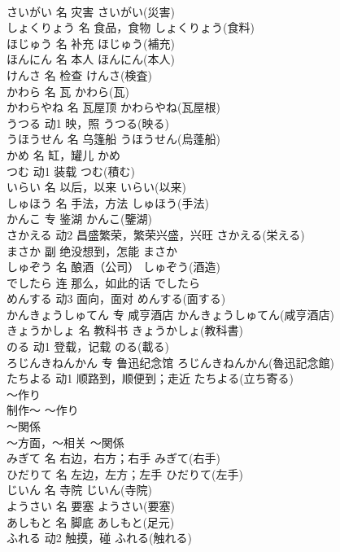 \documentclass[8pt]{extreport}
\begin{document}
\begin{CJK}{UTF8}{min}
\\	さいがい	名	灾害	さいがい(災害)	
\\	しょくりょう	名	食品，食物	しょくりょう(食料)	
\\	ほじゅう	名	补充	ほじゅう(補充)	
\\	ほんにん	名	本人	ほんにん(本人)	
\\	けんさ	名	检查	けんさ(検査)	
\\	かわら	名	瓦	かわら(瓦)	
\\	かわらやね	名	瓦屋顶	かわらやね(瓦屋根)	
\\	うつる	动1	映，照	うつる(映る)	
\\	うほうせん	名	乌篷船	うほうせん(烏蓬船)	
\\	かめ	名	缸，罐儿	かめ	
\\	つむ	动1	装载	つむ(積む)	
\\	いらい	名	以后，以来	いらい(以来)	
\\	しゅほう	名	手法，方法	しゅほう(手法)	
\\	かんこ	专	鉴湖	かんこ(鑒湖)	
\\	さかえる	动2	昌盛繁荣，繁荣兴盛，兴旺	さかえる(栄える)	
\\	まさか	副	绝没想到，怎能	まさか	
\\	しゅぞう	名	酿酒（公司）	しゅぞう(酒造)	
\\	でしたら	连	那么，如此的话	でしたら	
\\	めんする	动3	面向，面对	めんする(面する)	
\\	かんきょうしゅてん	专	咸亨酒店	かんきょうしゅてん(咸亨酒店)	
\\	きょうかしょ	名	教科书	きょうかしょ(教科書)	
\\	のる	动1	登载，记载	のる(載る)	
\\	ろじんきねんかん	专	鲁迅纪念馆	ろじんきねんかん(魯迅記念館)	
\\	たちよる	动1	顺路到，顺便到；走近	たちよる(立ち寄る)	
\\	～作り	
\\	制作～	～作り	
\\	～関係	
\\	～方面，～相关	～関係	
\\	みぎて	名	右边，右方；右手	みぎて(右手)	
\\	ひだりて	名	左边，左方；左手	ひだりて(左手)	
\\	じいん	名	寺院	じいん(寺院)	
\\	ようさい	名	要塞	ようさい(要塞)	
\\	あしもと	名	脚底	あしもと(足元)	
\\	ふれる	动2	触摸，碰	ふれる(触れる)	

\end{CJK}
\end{document}
